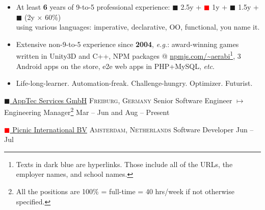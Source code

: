 \documentclass[10pt,a4paper]{article}
\newcommand{\colorsquare}[1]{\textcolor{#1}{$\blacksquare$}}
\begin{document}
\begin{itemize}
    \item At least \textbf{6} years of 9-to-5 professional experience:
      \colorsquare{frenchblue} 2.5y +
      \colorsquare{red} 1y +
      \colorsquare{bazaar} 1.5y +
      \colorsquare{camouflagegreen} (2y $\times$ 60\%) \\
        using various languages: imperative, declarative, OO, functional, you name it.
    
    \item Extensive non-9-to-5 experience since \textbf{2004}, \textit{e.g.}:
    award-winning games written in Unity3D and C++,
    NPM packages @ \href{https://www.npmjs.com/~aerabi}{\url{npmjs.com/~aerabi}}\footnote{Texts in dark blue are hyperlinks. Those include all of the URLs, the employer names, and school names.}, 3 Android apps on the store, e2e web apps in PHP+MySQL, \textit{etc}.
    
    \item Life-long-learner. Automation-freak. Challenge-hungry. Optimizer. Futurist.
\end{itemize}

\spacedhrule{-0.2em}{-0.4em}


\headedsection
  {\href{https://www.apptec360.com/}{\colorsquare{frenchblue} AppTec Services GmbH}}
  {\textsc{Freiburg, Germany}} {%
  \headedsubsection
    {Senior Software Engineer $\mapsto$ Engineering Manager\footnote{All the positions are 100\% = full-time = 40 hrs/week if not otherwise specified.}}
    {Mar  -- Jun  and Aug  -- Present}
    {}
}

\headedsection
  {\href{https://picnic.app/}{\colorsquare{red} Picnic International BV}}
  {\textsc{Amsterdam, Netherlands}} {%
  \headedsubsection
    {Software Developer}
    {Jun  -- Jul }
    {}
}
\end{document}
